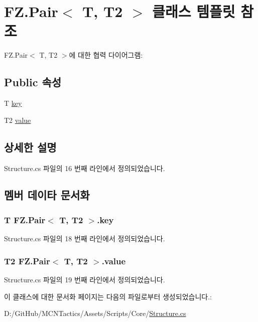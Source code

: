\hypertarget{class_f_z_1_1_pair}{}\section{F\+Z.\+Pair$<$ T, T2 $>$ 클래스 템플릿 참조}
\label{class_f_z_1_1_pair}


F\+Z.\+Pair$<$ T, T2 $>$에 대한 협력 다이어그램\+:
\subsection*{Public 속성}
\begin{DoxyCompactItemize}
\item 
T \hyperlink{class_f_z_1_1_pair_a36d4b7c90f0a247dff54da733701a53a}{key}
\item 
T2 \hyperlink{class_f_z_1_1_pair_a548bd4cfb4d1587016f1f53be6fac5b8}{value}
\end{DoxyCompactItemize}


\subsection{상세한 설명}


Structure.\+cs 파일의 16 번째 라인에서 정의되었습니다.



\subsection{멤버 데이타 문서화}
\subsubsection[{\texorpdfstring{key}{key}}]{\setlength{\rightskip}{0pt plus 5cm}T {\bf F\+Z.\+Pair}$<$ T, T2 $>$.key}\hypertarget{class_f_z_1_1_pair_a36d4b7c90f0a247dff54da733701a53a}{}\label{class_f_z_1_1_pair_a36d4b7c90f0a247dff54da733701a53a}


Structure.\+cs 파일의 18 번째 라인에서 정의되었습니다.

\subsubsection[{\texorpdfstring{value}{value}}]{\setlength{\rightskip}{0pt plus 5cm}T2 {\bf F\+Z.\+Pair}$<$ T, T2 $>$.value}\hypertarget{class_f_z_1_1_pair_a548bd4cfb4d1587016f1f53be6fac5b8}{}\label{class_f_z_1_1_pair_a548bd4cfb4d1587016f1f53be6fac5b8}


Structure.\+cs 파일의 19 번째 라인에서 정의되었습니다.



이 클래스에 대한 문서화 페이지는 다음의 파일로부터 생성되었습니다.\+:\begin{DoxyCompactItemize}
\item 
D\+:/\+Git\+Hub/\+M\+C\+N\+Tactics/\+Assets/\+Scripts/\+Core/\hyperlink{_structure_8cs}{Structure.\+cs}\end{DoxyCompactItemize}
